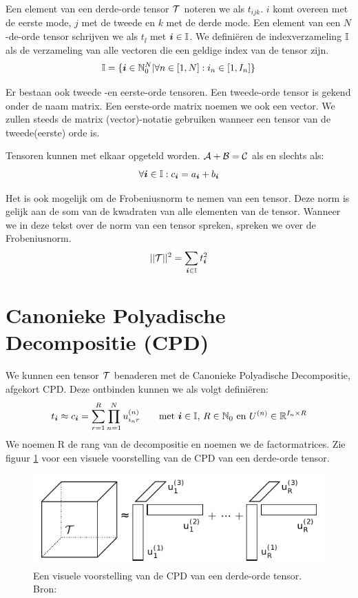 Een element van een derde-orde tensor $\mathcal{T}$ noteren we als $t_{ijk}$. $i$ komt overeen met de eerste mode, $j$ met de tweede en $k$ met de derde mode. Een element van een $N$-de-orde tensor schrijven we als $t_{\ii{}}$ met $\boldsymbol{i}{} \in \mathbb{I}$. We defini\"eren de indexverzameling $\mathbb{I}$ als de verzameling van alle vectoren die een geldige index van de tensor zijn.
\[
    \mathbb{I} = \{\boldsymbol{i}{} \in \mathbb{N}_0^N | \forall n \in [1, N]: i_n \in [1, I_n]\}
\]


Er bestaan ook tweede -en eerste-orde tensoren. Een tweede-orde tensor is gekend onder de naam matrix. Een eerste-orde matrix noemen we ook een vector. We zullen steeds de matrix (vector)-notatie gebruiken wanneer een tensor van de tweede(eerste) orde is.

Tensoren kunnen met elkaar opgeteld worden. $\mathcal{A} + \mathcal{B} = \mathcal{C}$ als en slechts als:
\[
	\forall \boldsymbol{i}{} \in \mathbb{I}: c_{\boldsymbol{i}{}} = a_{\boldsymbol{i}{}} + b_{\boldsymbol{i}{}}
\]

Het is ook mogelijk om de Frobeniusnorm te nemen van een tensor. Deze norm is gelijk aan de som van de kwadraten van alle elementen van de tensor. Wanneer we in deze tekst over de norm van een tensor spreken, spreken we over de Frobeniusnorm.
\[
	||\mathcal{T}||^2 = \sum_{\boldsymbol{i}{} \in \mathbb{I}} t_{\boldsymbol{i}{}}^2
\]

\section{Canonieke Polyadische Decompositie (CPD)}
We kunnen een tensor $\mathcal{T}$ benaderen met de Canonieke Polyadische Decompositie, afgekort CPD.%
Deze ontbinden kunnen we als volgt defini\"eren:
\[
    t_{\boldsymbol{i}{}} \approx c_{\boldsymbol{i}{}} = \sum_{r=1}^{R} \prod_{n=1}^{N} u^{(n)}_{i_{n}r} \qquad
    \text{met $\boldsymbol{i}{} \in \mathbb{I}$, $R \in \mathbb{N}_0$ en $U^{(n)} \in \mathbb{R}^{I_n \times R} $}
\]
We noemen R de rang van de decompositie en \UUU{} noemen we de factormatrices. Zie figuur \ref{cpdTekening} voor een visuele voorstelling van de CPD van een derde-orde tensor.

\begin{figure}
\centering
\includegraphics{cpd}
\caption{\label{cpdTekening}Een visuele voorstelling van de CPD van een derde-orde tensor. Bron: \cite[p.~4]{laurent}}
\end{figure}

